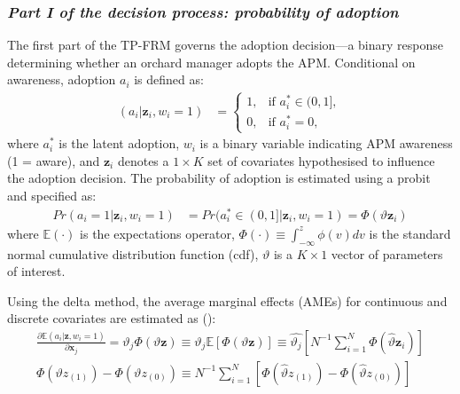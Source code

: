 \documentclass[fleqn,twoside,reqno]{article}
\begin{document}
\subsubsection*{\textit{Part I of the decision process:  probability of adoption}}
The first part of the TP-FRM governs the adoption decision---a binary response determining whether an orchard manager adopts the APM. Conditional on awareness, adoption $a_i$ is defined as:
\begin{align}
(a_i | \mathbf{z}_i, w_i = 1) &= \begin{cases} 
1, & \text{if } a_i^* \in (0,1], \\
0, & \text{if } a_i^* = 0,
\end{cases}
\label{eq:5}
\end{align}
where $a_i^*$ is the latent adoption, $w_i$ is a binary variable indicating APM awareness (1 = aware), and $\mathbf{z}_i$ denotes a $1 \times K$ set of covariates hypothesised to influence the adoption decision. The probability of adoption is estimated using a probit and specified as:
\begin{align}
Pr(a_i = 1 | \mathbf{z}_i, w_i = 1) &= Pr(a_i^* \in (0,1]| \mathbf{z}_i, w_i = 1) = \Phi(\vartheta \mathbf{z}_i)
\label{eq:6}
\end{align}
where $\mathbb{E}(\cdot)$ is the expectations operator, $\Phi(\cdot) \equiv \int_{-\infty}^{z} \phi(v)dv$ is the standard normal cumulative distribution function (cdf), $\vartheta$ is a $K \times 1$ vector of parameters of interest.

Using the delta method, the average marginal effects (AMEs) for continuous and discrete covariates are estimated as (\cite{Papke2008}):
\begin{align}
\frac{\partial \mathbb{E}(a_i | \mathbf{z}, w_i = 1)}{\partial \mathbf{x}_j} = \vartheta_j \Phi(\vartheta \mathbf{z}) \equiv \vartheta_j \mathbb{E}[\Phi(\vartheta \mathbf{z})] \equiv \hat{\vartheta_j} \left[N^{-1} \sum_{i=1}^{N} \Phi(\hat{\vartheta} \mathbf{z}_i) \right]\\
\Phi(\vartheta z_{(1)}) - \Phi(\vartheta z_{(0)}) \equiv N^{-1} \sum_{i=1}^{N} \left[\Phi(\hat{\vartheta}z_{(1)}) - \Phi(\hat{\vartheta}z_{(0)}) \right]
\end{align}
\end{document}
